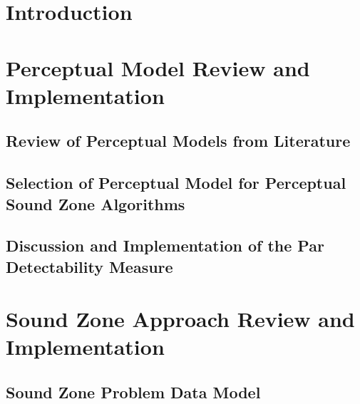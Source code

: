 \documentclass[10pt,twoside,openright,titlepage]{ce}
\begin{document}
\frontmatter
\makecover
\maketitle
\makesignature


\tableofcontents
\mainmatter

\chapter{Introduction}
\label{ch:introduction}

\newpage


\chapter{Perceptual Model Review and Implementation}
\label{ch:perceptual}

\newpage
\section{Review of Perceptual Models from Literature}
\label{ch:perceptual:review}

\newpage
\section{Selection of Perceptual Model for Perceptual Sound Zone Algorithms}
\label{ch:perceptual:selection}

\newpage
\section{Discussion and Implementation of the Par Detectability Measure}
\label{ch:perceptual:implementation}

\newpage

\chapter{Sound Zone Approach Review and Implementation}
\label{ch:sound_zone}

\newpage
\section{Sound Zone Problem Data Model}
\label{ch:sound_zone:data_model}

\newpage
\end{document}
